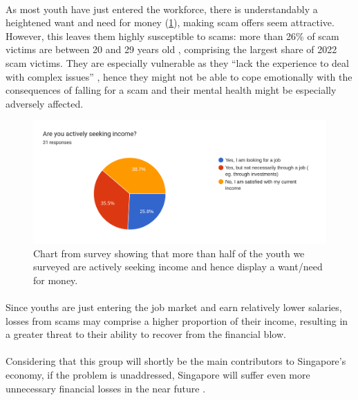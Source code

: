 \message{ !name(written-report.tex)}\documentclass[a4paper]{article}
\begin{document}
\paragraph{} As most youth have just entered the workforce, there is
understandably a heightened want and need for money (\cref{fig:incomegraph}),
making scam offers seem attractive. However, this leaves them highly susceptible
to scams: more than 26\% of scam victims are between 20 and 29 years old
\parencite{Chua.2023}, comprising the largest share of 2022 scam victims. They
are especially vulnerable as they ``lack the experience to deal with complex
issues'' \parencite{SiowDivi.2023}, hence they might not be able to cope
emotionally with the consequences of falling for a scam and their mental health
might be especially adversely affected.

\begin{figure}[ht]
  \centering \includegraphics[width=\textwidth]{incomegraph}
  \caption{Chart from survey showing that more than half of the youth we
    surveyed are actively seeking income and hence display a want/need for
    money.}\label{fig:incomegraph}
\end{figure}

\paragraph{} Since youths are just entering the job market and earn relatively
lower salaries, losses from scams may comprise a higher proportion of their
income, resulting in a greater threat to their ability to recover from the
financial blow.

\paragraph{} Considering that this group will shortly be the main contributors
to Singapore’s economy, if the problem is unaddressed, Singapore will suffer
even more unnecessary financial losses in the near future
\parencite{SiowDivi.2023}.
\end{document}
